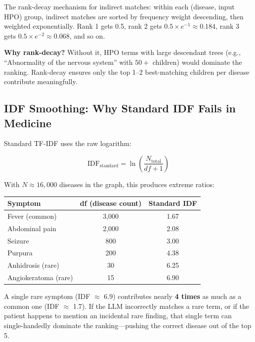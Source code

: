 \documentclass[11pt,a4paper]{article}
\begin{document}
The rank-decay mechanism for indirect matches: within each (disease, input HPO) group, indirect matches are sorted by frequency weight descending, then weighted exponentially. Rank 1 gets 0.5, rank 2 gets $0.5 \times e^{-1} \approx 0.184$, rank 3 gets $0.5 \times e^{-2} \approx 0.068$, and so on.

\begin{callout}
\textbf{Why rank-decay?} Without it, HPO terms with large descendant trees (e.g., ``Abnormality of the nervous system'' with $50+$ children) would dominate the ranking. Rank-decay ensures only the top 1–2 best-matching children per disease contribute meaningfully.
\end{callout}

\subsection{IDF Smoothing: Why Standard IDF Fails in Medicine}

Standard TF-IDF uses the raw logarithm:

\begin{equation}
\text{IDF}_{\text{standard}} = \ln\left(\frac{N_{\text{total}}}{df + 1}\right)
\end{equation}

With $N \approx 16{,}000$ diseases in the graph, this produces extreme ratios:

\begin{table}[H]
\centering
\begin{tabular}{@{}lcc@{}}
\toprule
\textbf{Symptom} & \textbf{df (disease count)} & \textbf{Standard IDF} \\
\midrule
Fever (common)       & 3,000 & 1.67 \\
Abdominal pain       & 2,000 & 2.08 \\
Seizure              & 800   & 3.00 \\
Purpura              & 200   & 4.38 \\
Anhidrosis (rare)    & 30    & 6.25 \\
Angiokeratoma (rare) & 15    & 6.90 \\
\bottomrule
\end{tabular}
\end{table}

A single rare symptom (IDF $\approx$ 6.9) contributes nearly \textbf{4 times} as much as a common one (IDF $\approx$ 1.7). If the LLM incorrectly matches a rare term, or if the patient happens to mention an incidental rare finding, that single term can single-handedly dominate the ranking—pushing the correct disease out of the top 5.
\end{document}
